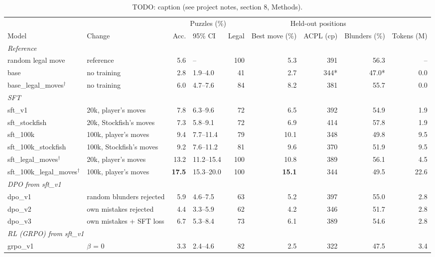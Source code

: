 \begin{table}[t]
\centering
\footnotesize
\setlength{\tabcolsep}{4pt}
\caption{TODO: caption (see project notes, section 8, Methods).}
\label{tab:models}
\begin{tabular}{llrlrrrrr}
\toprule
 &  & \multicolumn{3}{c}{Puzzles (\%)} & \multicolumn{3}{c}{Held-out positions} &  \\
\cmidrule(lr){3-5} \cmidrule(lr){6-8}
Model & Change & Acc. & 95\% CI & Legal & Best move (\%) & ACPL (cp) & Blunders (\%) & Tokens (M) \\
\midrule
\multicolumn{9}{l}{\emph{Reference}} \\
random legal move & reference & 5.6 & -- & 100 & 5.3 & 391 & 56.3 & -- \\
base & no training & 2.8 & 1.9--4.0 & 41 & 2.7 & 344* & 47.0* & 0.0 \\
base\_legal\_moves$^\dagger$ & no training & 6.0 & 4.7--7.6 & 84 & 8.2 & 381 & 55.7 & 0.0 \\
\midrule
\multicolumn{9}{l}{\emph{SFT}} \\
sft\_v1 & 20k, player's moves & 7.8 & 6.3--9.6 & 72 & 6.5 & 392 & 54.9 & 1.9 \\
sft\_stockfish & 20k, Stockfish's moves & 7.3 & 5.8--9.1 & 72 & 6.9 & 414 & 57.8 & 1.9 \\
sft\_100k & 100k, player's moves & 9.4 & 7.7--11.4 & 79 & 10.1 & 348 & 49.8 & 9.5 \\
sft\_100k\_stockfish & 100k, Stockfish's moves & 9.2 & 7.6--11.2 & 81 & 9.6 & 370 & 51.9 & 9.5 \\
sft\_legal\_moves$^\dagger$ & 20k, player's moves & 13.2 & 11.2--15.4 & 100 & 10.8 & 389 & 56.1 & 4.5 \\
sft\_100k\_legal\_moves$^\dagger$ & 100k, player's moves & \textbf{17.5} & 15.3--20.0 & 100 & \textbf{15.1} & 344 & 49.5 & 22.6 \\
\midrule
\multicolumn{9}{l}{\emph{DPO from sft\_v1}} \\
dpo\_v1 & random blunders rejected & 5.9 & 4.6--7.5 & 63 & 5.2 & 397 & 55.0 & 2.8 \\
dpo\_v2 & own mistakes rejected & 4.4 & 3.3--5.9 & 62 & 4.2 & 346 & 51.7 & 2.8 \\
dpo\_v3 & own mistakes + SFT loss & 6.7 & 5.3--8.4 & 73 & 6.1 & 389 & 54.6 & 2.8 \\
\midrule
\multicolumn{9}{l}{\emph{RL (GRPO) from sft\_v1}} \\
grpo\_v1 & $\beta$ = 0 & 3.3 & 2.4--4.6 & 82 & 2.5 & 322 & 47.5 & 3.4 \\

\end{tabular}
\end{table}
